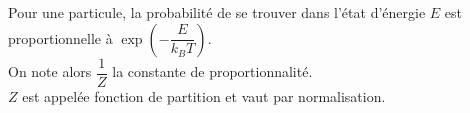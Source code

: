 ﻿\documentclass[a4paper]{article}
\begin{document}
\pagestyle{fancy}
\fancyhf{}
\setlength{\headheight}{15pt}

\begin{center}
	\large{}
\end{center}


Pour une particule, la probabilité de se trouver dans l'état d'énergie \(E\) est proportionnelle à \(\exp(-\dfrac{E}{k_BT})\).\\
On note alors \(\dfrac{1}{Z}\) la constante de proportionnalité.\\
\(Z\) est appelée fonction de partition et vaut  par normalisation.
\end{document}
